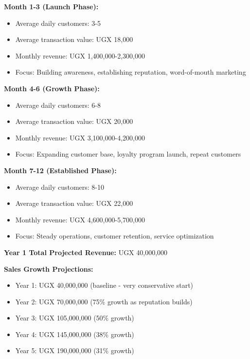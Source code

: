 \textbf{Month 1-3 (Launch Phase):}
\begin{itemize}[leftmargin=2em]
    \item Average daily customers: 3-5
    \item Average transaction value: UGX 18,000
    \item Monthly revenue: UGX 1,400,000-2,300,000
    \item Focus: Building awareness, establishing reputation, word-of-mouth marketing
\end{itemize}

\textbf{Month 4-6 (Growth Phase):}
\begin{itemize}[leftmargin=2em]
    \item Average daily customers: 6-8
    \item Average transaction value: UGX 20,000
    \item Monthly revenue: UGX 3,100,000-4,200,000
    \item Focus: Expanding customer base, loyalty program launch, repeat customers
\end{itemize}

\textbf{Month 7-12 (Established Phase):}
\begin{itemize}[leftmargin=2em]
    \item Average daily customers: 8-10
    \item Average transaction value: UGX 22,000
    \item Monthly revenue: UGX 4,600,000-5,700,000
    \item Focus: Steady operations, customer retention, service optimization
\end{itemize}

\textbf{Year 1 Total Projected Revenue:} UGX 40,000,000

\textbf{Sales Growth Projections:}
\begin{itemize}[leftmargin=2em]
    \item Year 1: UGX 40,000,000 (baseline - very conservative start)
    \item Year 2: UGX 70,000,000 (75\% growth as reputation builds)
    \item Year 3: UGX 105,000,000 (50\% growth)
    \item Year 4: UGX 145,000,000 (38\% growth)
    \item Year 5: UGX 190,000,000 (31\% growth)
\end{itemize}

\vspace{1em}


